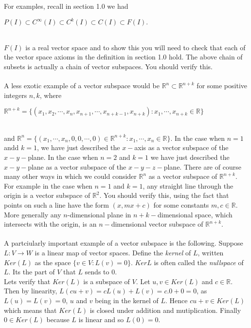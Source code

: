 \documentclass{amsart}
\begin{document}
For examples, recall in section 1.0 we had\\
\centerline{$P(I)\subset C^{\infty}(I)\subset C^{k}(I)\subset C(I)\subset F(I).$}\\
$F(I)$ is a real vector space and to show this you will need to check that each of the vector space axioms in the definition in section 1.0 hold. The above chain of subsets is actually a chain of vector subspaces. You should verify this.\\
\\
A less exotic example of a vector subspace would be $\mathbb{R}^{n}\subset \mathbb{R}^{n+k}$ for some positive integers $n,k$, where\\ \centerline{$\mathbb{R}^{n+k}=\{(x_1,x_2,\cdots,x_n,x_{n+1},\cdots,x_{n+k-1},x_{n+k}):x_1,\cdots,x_{n+k}\in\mathbb{R}\}$}\\ and $\mathbb{R}^{n}=\{(x_1,\cdots,x_n,0,0,\cdots,0)\in\mathbb{R}^{n+k}:x_1,\cdots,x_n\in\mathbb{R}\}$. In the case when $n=1$ andd $k=1$, we have just described the $x-$axis as a vector subspace of the $x-y-$plane. In the case when $n=2$ and $k=1$ we have just described the $x-y-$plane as a vector subspace of the $x-y-z-$plane. There are of course many other ways in which we could consider $\mathbb{R}^{n}$ as a vector subspace of $\mathbb{R}^{n+k}$. For example in the case when $n=1$ and $k=1$, any straight line through the origin is a vector subspace of $\mathbb{R}^2$. You should verify this, using the fact that points on such a line have the form $(x,mx+c)$ for some constants $m,c\in\mathbb{R}$. More generally any $n$-dimensional plane in $n+k-$dimensional space, which intersects with the origin, is an $n-$dimensional vector subspace of $\mathbb{R}^{n+k}$.\\
\\
A partciularly important example of a vector subspace is the following. Suppose $L:V\rightarrow W$ is a linear map of vector spaces. Define the {\it kernel} of $L$, written $Ker (L)$ as the space $\{v\in V:L(v)=0\}$. $Ker L$ is often called the {\it nullspace} of $L$. Its the part of $V$ that $L$ sends to $0$.\\
Lets verify that $Ker (L)$ is a subspace of $V$. Let $u,v\in Ker (L)$ and $c\in \mathbb{R}$. Then by linearity, $L(cu+v)=cL(u)+L(v)=c.0+0=0$, as $L(u)=L(v)=0$, $u$ and $v$ being in the kernel of $L$. Hence $cu+v\in Ker(L)$ which means that $Ker(L)$ is closed under addition and mutiplication. Finally $0\in Ker(L)$ because $L$ is linear and so $L(0)=0$.\\
\\
\end{document}
